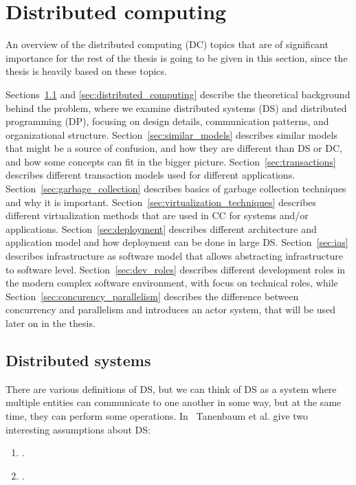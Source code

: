 \chapter{Distributed computing}\label{chapter:Field_overview}
%
An overview of the distributed computing (DC) topics that are of significant importance for the rest of the thesis is going to be given in this section, since the thesis is heavily based on these topics. 

Sections~\ref{sec:distributed_systems} and \ref{sec:distributed_computing} describe the theoretical background behind the problem, where we examine distributed systems (DS) and distributed programming (DP), focusing on design details, communication patterns, and organizational structure. Section~\ref{sec:similar_models} describes similar models that might be a source of confusion, and how they are different than DS or DC, and how some concepts can fit in the bigger picture. Section~\ref{sec:transactions} describes different transaction models used for different applications. Section~\ref{sec:garbage_collection} describes basics of garbage collection techniques and why it is important. Section~\ref{sec:virtualization_techniques} describes different virtualization methods that are used in CC for systems and/or applications. Section~\ref{sec:deployment} describes different architecture and application model and how deployment can be done in large DS. Section~\ref{sec:ias} describes infrastructure as software model that allows abstracting infrastructure to software level. Section~\ref{sec:dev_roles} describes different development roles in the modern complex software environment, with focus on technical roles, while Section~\ref{sec:concurency_parallelism} describes the difference between concurrency and parallelism and introduces an actor system, that will be used later on in the thesis. 

\section{Distributed systems}\label{sec:distributed_systems}
%
There are various definitions of DS, but we can think of DS as a system where multiple entities can communicate to one another in some way, but at the same time, they can perform some operations. In~\cite{SteenT16, 0019513} Tanenbaum et al. give two interesting assumptions about DS:

\begin{enumerate}[start=1,label={(\bfseries \arabic*)}]
	\item  {}.
	\item {}.\label{ds:asumption_2}
\end{enumerate}

